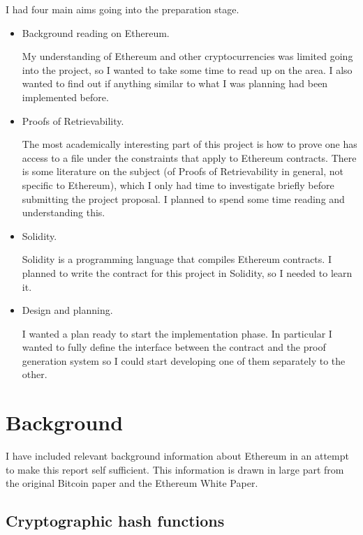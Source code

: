 \documentclass[12pt,a4paper,twoside,openright]{report}
\begin{document}
I had four main aims going into the preparation stage.
\begin{itemize}
\item Background reading on Ethereum.

My understanding of Ethereum and other cryptocurrencies was limited going into the project, so I wanted to
take some time to read up on the area. I also wanted to find out if anything similar to what I was planning
had been implemented before.

\item Proofs of Retrievability.

The most academically interesting part of this project is how to prove one has access to a file
under the constraints that apply to Ethereum contracts.
There is some literature on the subject (of Proofs of Retrievability in general, not specific to Ethereum),
which I only had time to investigate briefly before submitting the project proposal.
I planned to spend some time reading and understanding this.

\item Solidity.

Solidity is a programming language that compiles Ethereum contracts.
I planned to write the contract for this project in Solidity, so I needed to learn it.

\item Design and planning.

I wanted a plan ready to start the implementation phase.
In particular I wanted to fully define the interface between the contract and the proof generation system 
so I could start developing one of them separately to the other.


\end{itemize}


\section{Background}

I have included relevant background information about Ethereum in an attempt to make this report self sufficient.
This information is drawn in large part from the original Bitcoin paper\cite{bitcoin-whitepaper} and the Ethereum White Paper\cite{eth-whitepaper}.

\subsection{Cryptographic hash functions} \label{crypto-hash}
\end{document}
